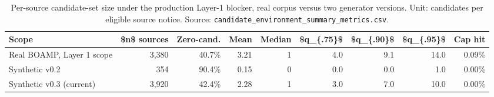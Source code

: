 \begin{table}[htbp]
\centering
\small
\caption{Per-source candidate-set size under the production Layer-1 blocker, real corpus versus two generator versions. Unit: candidates per eligible source notice. Source: \texttt{candidate\_environment\_summary\_metrics.csv}.}
\label{tab:candenv}
\begin{tabularx}{\textwidth}{>{\raggedright\arraybackslash}Xrrrrrrrr}
\toprule
Scope & \$n\$ sources & Zero-cand. & Mean & Median & \$q\_\{.75\}\$ & \$q\_\{.90\}\$ & \$q\_\{.95\}\$ & Cap hit \\
\midrule
Real BOAMP, Layer 1 scope & 3{,}380 & 40.7\% & 3.21 & 1 & 4.0 & 9.1 & 14.0 & 0.09\% \\
Synthetic v0.2 & 354 & 90.4\% & 0.15 & 0 & 0.0 & 0.0 & 1.0 & 0.00\% \\
Synthetic v0.3 (current) & 3{,}920 & 42.4\% & 2.28 & 1 & 3.0 & 7.0 & 10.0 & 0.00\% \\
\bottomrule
\end{tabularx}
\end{table}
